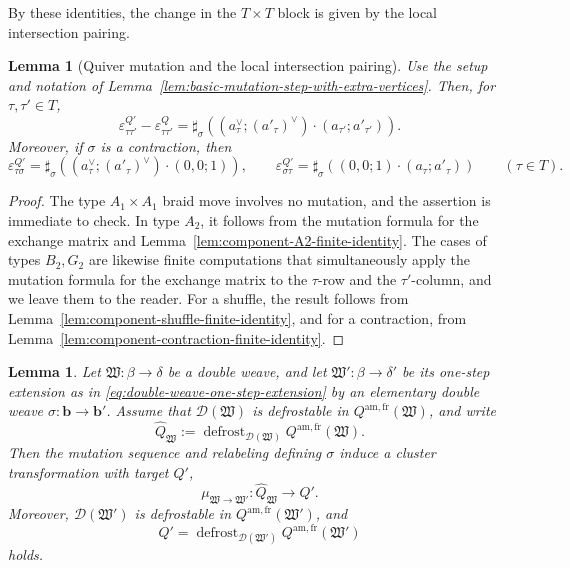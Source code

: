 \documentclass[10pt,a4paper]{article}
\newtheorem{lemma}[theorem]{Lemma}
\theoremstyle{definition}
\theoremstyle{remark}
\newcommand{\Dcal}{\mathcal D}
\newcommand{\eps}{\varepsilon}
\newcommand{\fW}{\mathfrak W}
\begin{document}
By these identities, the change in the \(T\times T\) block is given by the
local intersection pairing.
\begin{lemma}[Quiver mutation and the local intersection pairing]
\label{lem:extended-mutation-local-intersection}
Use the setup and notation of
Lemma~\ref{lem:basic-mutation-step-with-extra-vertices}.  Then, for
\(\tau,\tau'\in T\),
\begin{equation}
 \eps^{Q'}_{\tau\tau'}-\eps^Q_{\tau\tau'}
 =\sharp_\sigma\left(
  (a_\tau^\vee;(a'_\tau)^\vee)
  \mathbin{\cdot}(a_{\tau'};a'_{\tau'})
 \right).
 \label{eq:extra-vertex-local-intersection}
\end{equation}
Moreover, if \(\sigma\) is a contraction, then
\begin{equation}
 \eps^{Q'}_{\tau\sigma}
 =\sharp_\sigma\left(
  (a_\tau^\vee;(a'_\tau)^\vee)
  \mathbin{\cdot}(0,0;1)
 \right),
 \qquad
 \eps^{Q'}_{\sigma\tau}
 =\sharp_\sigma\left(
  (0,0;1)
  \mathbin{\cdot}(a_\tau;a'_\tau)
 \right)
 \qquad(\tau\in T).
 \label{eq:extra-vertex-new-local-intersection}
\end{equation}
\end{lemma}

\begin{proof}
The type \(A_1\times A_1\) braid move involves no mutation, and the assertion
is immediate to check.  In type \(A_2\), it follows from the mutation formula
for the exchange matrix and Lemma~\ref{lem:component-A2-finite-identity}.  The
cases of types \(B_2,G_2\) are likewise finite computations that simultaneously
apply the mutation formula for the exchange matrix to the \(\tau\)-row and the
\(\tau'\)-column, and we leave them to the reader.  For a shuffle, the result
follows from Lemma~\ref{lem:component-shuffle-finite-identity}, and for a
contraction, from Lemma~\ref{lem:component-contraction-finite-identity}.
\end{proof}

\begin{lemma}
\label{lem:component-one-step-quiver-transition}
Let \(\fW:\beta\to\delta\) be a double weave, and let
\(\fW':\beta\to\delta'\) be its one-step extension as in
\eqref{eq:double-weave-one-step-extension} by an elementary double
weave \(\sigma:\mathbf b\to\mathbf b'\).  Assume that \(\Dcal(\fW)\) is
defrostable in \(Q^{\mathrm{am,fr}}(\fW)\), and write
\begin{equation}
 \widehat Q_\fW
 :=\operatorname{defrost}_{\Dcal(\fW)}Q^{\mathrm{am,fr}}(\fW).
 \label{eq:one-step-source-defrost}
\end{equation}
Then the mutation sequence and relabeling defining \(\sigma\) induce a cluster
transformation with target \(Q'\),
\begin{equation}
 \mu_{\fW\to\fW'}:\widehat Q_\fW\longrightarrow Q'.
 \label{eq:one-step-amalgamated-mutation}
\end{equation}
Moreover, \(\Dcal(\fW')\) is defrostable in
\(Q^{\mathrm{am,fr}}(\fW')\), and
\begin{equation}
 Q'
 =\operatorname{defrost}_{\Dcal(\fW')}Q^{\mathrm{am,fr}}(\fW')
 \label{eq:component-one-step-quiver-transition}
\end{equation}
holds.
\end{lemma}
\end{document}
